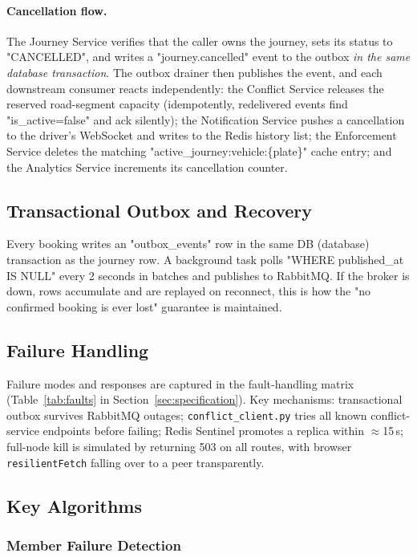 \documentclass[11pt,a4paper]{article}
\begin{document}
\paragraph{Cancellation flow.}
The Journey Service verifies that the caller owns the journey, sets its status to "CANCELLED", and writes a "journey.cancelled" event to the outbox \emph{in the same database transaction}. The outbox drainer then publishes the event, and each downstream consumer reacts independently: the Conflict Service releases the reserved road-segment capacity (idempotently, redelivered events find "is\_active=false" and ack silently); the Notification Service pushes a cancellation to the driver's WebSocket and writes to the Redis history list; the Enforcement Service deletes the matching "active\_journey:vehicle:\{plate\}" cache entry; and the Analytics Service increments its cancellation counter.

\subsection{Transactional Outbox and Recovery}

Every booking writes an "outbox\_events" row in the same DB (database) transaction as the journey row. A background task polls "WHERE published\_at IS NULL" every 2 seconds in batches and publishes to RabbitMQ. If the broker is down, rows accumulate and are replayed on reconnect, this is how the "no confirmed booking is ever lost" guarantee is maintained.

\subsection{Failure Handling}

Failure modes and responses are captured in the fault-handling matrix (Table~\ref{tab:faults} in Section~\ref{sec:specification}). Key mechanisms: transactional outbox survives RabbitMQ outages; \texttt{conflict\_client.py} tries all known conflict-service endpoints before failing; Redis Sentinel promotes a replica within $\approx$15\,s; full-node kill is simulated by returning 503 on all routes, with browser \texttt{resilientFetch} falling over to a peer transparently.
 
\subsection{Key Algorithms}
 
\subsubsection{Member Failure Detection}
\end{document}
